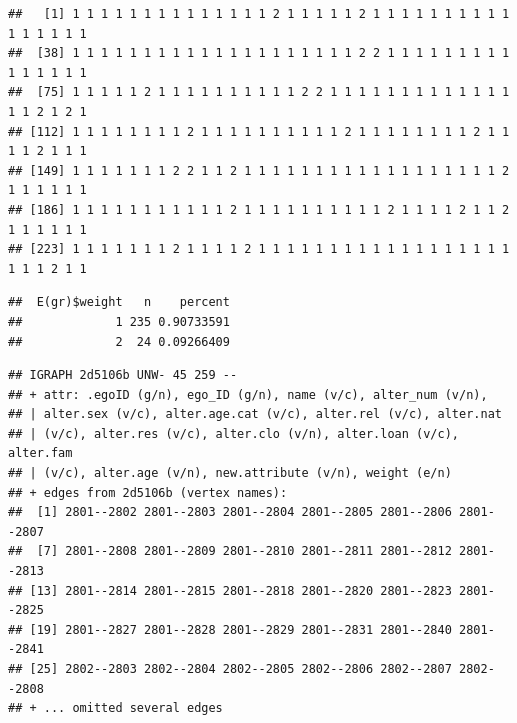 \documentclass[
]{book}
\newenvironment{Shaded}{\begin{snugshade}}{\end{snugshade}}
\newcommand{\CommentTok}[1]{\textcolor[rgb]{0.56,0.35,0.01}{\textit{#1}}}
\newcommand{\DecValTok}[1]{\textcolor[rgb]{0.00,0.00,0.81}{#1}}
\newcommand{\FunctionTok}[1]{\textcolor[rgb]{0.00,0.00,0.00}{#1}}
\newcommand{\NormalTok}[1]{#1}
\newcommand{\OtherTok}[1]{\textcolor[rgb]{0.56,0.35,0.01}{#1}}
\newcommand{\SpecialCharTok}[1]{\textcolor[rgb]{0.00,0.00,0.00}{#1}}
\begin{document}
\begin{Shaded}
\end{Shaded}

\begin{verbatim}
##   [1] 1 1 1 1 1 1 1 1 1 1 1 1 1 1 2 1 1 1 1 1 2 1 1 1 1 1 1 1 1 1 1 1 1 1 1 1 1
##  [38] 1 1 1 1 1 1 1 1 1 1 1 1 1 1 1 1 1 1 1 1 2 2 1 1 1 1 1 1 1 1 1 1 1 1 1 1 1
##  [75] 1 1 1 1 1 2 1 1 1 1 1 1 1 1 1 1 2 2 1 1 1 1 1 1 1 1 1 1 1 1 1 1 1 2 1 2 1
## [112] 1 1 1 1 1 1 1 1 2 1 1 1 1 1 1 1 1 1 1 2 1 1 1 1 1 1 1 1 2 1 1 1 1 2 1 1 1
## [149] 1 1 1 1 1 1 1 2 2 1 1 2 1 1 1 1 1 1 1 1 1 1 1 1 1 1 1 1 1 1 2 1 1 1 1 1 1
## [186] 1 1 1 1 1 1 1 1 1 1 1 2 1 1 1 1 1 1 1 1 1 1 2 1 1 1 1 2 1 1 2 1 1 1 1 1 1
## [223] 1 1 1 1 1 1 1 2 1 1 1 1 2 1 1 1 1 1 1 1 1 1 1 1 1 1 1 1 1 1 1 1 1 1 2 1 1
\end{verbatim}

\begin{Shaded}
\end{Shaded}

\begin{verbatim}
##  E(gr)$weight   n    percent
##             1 235 0.90733591
##             2  24 0.09266409
\end{verbatim}

\begin{Shaded}
\end{Shaded}

\begin{verbatim}
## IGRAPH 2d5106b UNW- 45 259 -- 
## + attr: .egoID (g/n), ego_ID (g/n), name (v/c), alter_num (v/n),
## | alter.sex (v/c), alter.age.cat (v/c), alter.rel (v/c), alter.nat
## | (v/c), alter.res (v/c), alter.clo (v/n), alter.loan (v/c), alter.fam
## | (v/c), alter.age (v/n), new.attribute (v/n), weight (e/n)
## + edges from 2d5106b (vertex names):
##  [1] 2801--2802 2801--2803 2801--2804 2801--2805 2801--2806 2801--2807
##  [7] 2801--2808 2801--2809 2801--2810 2801--2811 2801--2812 2801--2813
## [13] 2801--2814 2801--2815 2801--2818 2801--2820 2801--2823 2801--2825
## [19] 2801--2827 2801--2828 2801--2829 2801--2831 2801--2840 2801--2841
## [25] 2802--2803 2802--2804 2802--2805 2802--2806 2802--2807 2802--2808
## + ... omitted several edges
\end{verbatim}
\end{document}
